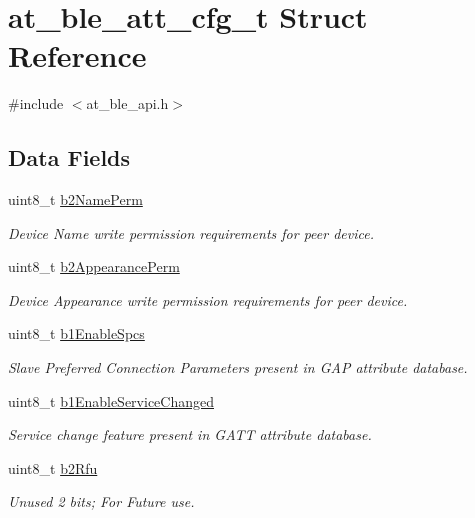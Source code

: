 \hypertarget{structat__ble__att__cfg__t}{}\section{at\+\_\+ble\+\_\+att\+\_\+cfg\+\_\+t Struct Reference}
\label{structat__ble__att__cfg__t}


{\ttfamily \#include $<$at\+\_\+ble\+\_\+api.\+h$>$}

\subsection*{Data Fields}
\begin{DoxyCompactItemize}
\item 
uint8\+\_\+t \mbox{\hyperlink{structat__ble__att__cfg__t_a9b58d5c2c5cfd7bd60bab8edee6062c9}{b2\+Name\+Perm}}
\begin{DoxyCompactList}\small\item\em Device Name write permission requirements for peer device. \end{DoxyCompactList}\item 
uint8\+\_\+t \mbox{\hyperlink{structat__ble__att__cfg__t_aad9368e69f65d212ce361dd716d85a96}{b2\+Appearance\+Perm}}
\begin{DoxyCompactList}\small\item\em Device Appearance write permission requirements for peer device. \end{DoxyCompactList}\item 
uint8\+\_\+t \mbox{\hyperlink{structat__ble__att__cfg__t_af6ff5d732db0289661e56ce65bfab35d}{b1\+Enable\+Spcs}}
\begin{DoxyCompactList}\small\item\em Slave Preferred Connection Parameters present in G\+AP attribute database. \end{DoxyCompactList}\item 
uint8\+\_\+t \mbox{\hyperlink{structat__ble__att__cfg__t_ae80850235515b7cd4da4ce3d4f25b851}{b1\+Enable\+Service\+Changed}}
\begin{DoxyCompactList}\small\item\em Service change feature present in G\+A\+TT attribute database. \end{DoxyCompactList}\item 
uint8\+\_\+t \mbox{\hyperlink{structat__ble__att__cfg__t_a7f14ba672570388a12b47fd7c0333581}{b2\+Rfu}}
\begin{DoxyCompactList}\small\item\em Unused 2 bits; For Future use. \end{DoxyCompactList}\end{DoxyCompactItemize}


